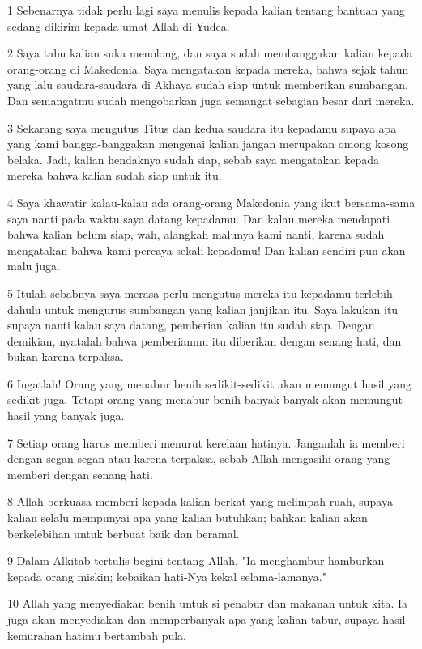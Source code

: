 \par 1 Sebenarnya tidak perlu lagi saya menulis kepada kalian tentang bantuan yang sedang dikirim kepada umat Allah di Yudea.
\par 2 Saya tahu kalian suka menolong, dan saya sudah membanggakan kalian kepada orang-orang di Makedonia. Saya mengatakan kepada mereka, bahwa sejak tahun yang lalu saudara-saudara di Akhaya sudah siap untuk memberikan sumbangan. Dan semangatmu sudah mengobarkan juga semangat sebagian besar dari mereka.
\par 3 Sekarang saya mengutus Titus dan kedua saudara itu kepadamu supaya apa yang kami bangga-banggakan mengenai kalian jangan merupakan omong kosong belaka. Jadi, kalian hendaknya sudah siap, sebab saya mengatakan kepada mereka bahwa kalian sudah siap untuk itu.
\par 4 Saya khawatir kalau-kalau ada orang-orang Makedonia yang ikut bersama-sama saya nanti pada waktu saya datang kepadamu. Dan kalau mereka mendapati bahwa kalian belum siap, wah, alangkah malunya kami nanti, karena sudah mengatakan bahwa kami percaya sekali kepadamu! Dan kalian sendiri pun akan malu juga.
\par 5 Itulah sebabnya saya merasa perlu mengutus mereka itu kepadamu terlebih dahulu untuk mengurus sumbangan yang kalian janjikan itu. Saya lakukan itu supaya nanti kalau saya datang, pemberian kalian itu sudah siap. Dengan demikian, nyatalah bahwa pemberianmu itu diberikan dengan senang hati, dan bukan karena terpaksa.
\par 6 Ingatlah! Orang yang menabur benih sedikit-sedikit akan memungut hasil yang sedikit juga. Tetapi orang yang menabur benih banyak-banyak akan memungut hasil yang banyak juga.
\par 7 Setiap orang harus memberi menurut kerelaan hatinya. Janganlah ia memberi dengan segan-segan atau karena terpaksa, sebab Allah mengasihi orang yang memberi dengan senang hati.
\par 8 Allah berkuasa memberi kepada kalian berkat yang melimpah ruah, supaya kalian selalu mempunyai apa yang kalian butuhkan; bahkan kalian akan berkelebihan untuk berbuat baik dan beramal.
\par 9 Dalam Alkitab tertulis begini tentang Allah, "Ia menghambur-hamburkan kepada orang miskin; kebaikan hati-Nya kekal selama-lamanya."
\par 10 Allah yang menyediakan benih untuk si penabur dan makanan untuk kita. Ia juga akan menyediakan dan memperbanyak apa yang kalian tabur, supaya hasil kemurahan hatimu bertambah pula.
